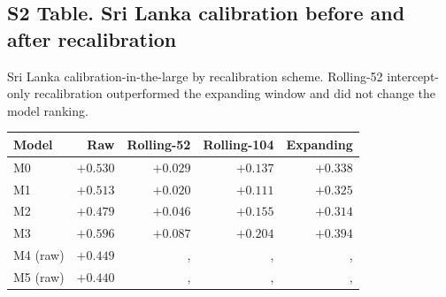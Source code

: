 \documentclass[11pt,a4paper]{article}
\begin{document}
\subsection*{S2 Table. Sri Lanka calibration before and after recalibration}
\noindent Sri Lanka calibration-in-the-large by recalibration scheme. Rolling-52 intercept-only recalibration outperformed the expanding window and did not change the model ranking.\\[0.3em]
{\footnotesize\begin{tabular}{@{}lrrrr@{}}
\toprule
Model & Raw & Rolling-52 & Rolling-104 & Expanding \\
\midrule
M0 & $+0.530$ & $+0.029$ & $+0.137$ & $+0.338$ \\
M1 & $+0.513$ & $+0.020$ & $+0.111$ & $+0.325$ \\
M2 & $+0.479$ & $+0.046$ & $+0.155$ & $+0.314$ \\
M3 & $+0.596$ & $+0.087$ & $+0.204$ & $+0.394$ \\
M4 (raw) & $+0.449$ &, &, &, \\
M5 (raw) & $+0.440$ &, &, &, \\
\bottomrule
\end{tabular}}
\end{document}
